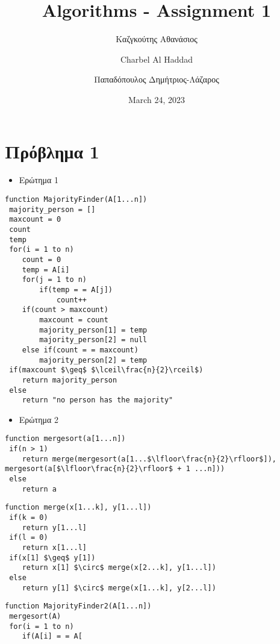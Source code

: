 \documentclass[a4paper]{article}
\title{\textbf{Algorithms - Assignment 1}}
\author{Καζγκούτης Αθανάσιος \and
	    Charbel Al Haddad \and 
	    Παπαδόπουλος Δημήτριος-Λάζαρος
}
\date{March 24, 2023}
\begin{document}
\maketitle
\pagebreak
\section*{Πρόβλημα 1}

\begin{itemize}
\item Ερώτημα 1
\end{itemize}

\lstset{numbers=left, numbersep=5pt,frame=single,  framexleftmargin=15pt}

\begin{lstlisting}[mathescape]
function MajorityFinder(A[1...n])
 majority_person = []
 maxcount = 0
 count
 temp
 for(i = 1 to n)
 	count = 0
 	temp = A[i]
 	for(j = 1 to n)
 		if(temp = = A[j])
 			count++
 	if(count > maxcount)
 		maxcount = count
 		majority_person[1] = temp
 		majority_person[2] = null
 	else if(count = = maxcount)
 		majority_person[2] = temp
 if(maxcount $\geq$ $\lceil\frac{n}{2}\rceil$)
 	return majority_person
 else 
 	return "no person has the majority"
\end{lstlisting}

\begin{itemize}
\item Ερώτημα 2
\end{itemize}

\lstset{numbers=left, numbersep=5pt,frame=none,  framexleftmargin=15pt}

\begin{tcolorbox}[colback=blue!20!white,colframe=purple!60!white,title=\textbf{Merge Sort}]
\begin{lstlisting}[mathescape]
function mergesort(a[1...n])
 if(n > 1)
 	return merge(mergesort(a[1...$\lfloor\frac{n}{2}\rfloor$]), mergesort(a[$\lfloor\frac{n}{2}\rfloor$ + 1 ...n]))
 else
 	return a
\end{lstlisting}

\begin{lstlisting}[mathescape]
function merge(x[1...k], y[1...l])
 if(k = 0)
 	return y[1...l]
 if(l = 0)
 	return x[1...l]
 if(x[1] $\geq$ y[1])
 	return x[1] $\circ$ merge(x[2...k], y[1...l])
 else
 	return y[1] $\circ$ merge(x[1...k], y[2...l])
\end{lstlisting}
\end{tcolorbox}

\lstset{numbers=left, numbersep=5pt,frame=single,  framexleftmargin=15pt}

\pagebreak

\begin{lstlisting}[mathescape]
function MajorityFinder2(A[1...n])
 mergesort(A)
 for(i = 1 to n)
 	if(A[i] = = A[
\end{lstlisting}
\end{document}
